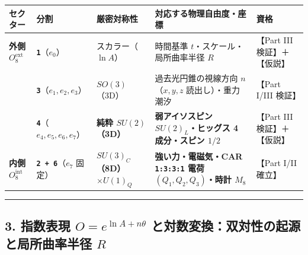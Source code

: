 \documentclass[
  a4paper,
]{ltjsarticle}
\newcounter{none} %
\begin{document}
{\def\LTcaptype{none} %
\begin{longtable}[]{@{}
  >{\raggedright\arraybackslash}p{}
  >{\raggedright\arraybackslash}p{}
  >{\raggedright\arraybackslash}p{}
  >{\raggedright\arraybackslash}p{}
  >{\raggedright\arraybackslash}p{}@{}}
\toprule\noalign{}
\begin{minipage}[b]{\linewidth}\raggedright
セクター
\end{minipage} & \begin{minipage}[b]{\linewidth}\raggedright
分割
\end{minipage} & \begin{minipage}[b]{\linewidth}\raggedright
厳密対称性
\end{minipage} & \begin{minipage}[b]{\linewidth}\raggedright
対応する物理自由度・座標
\end{minipage} & \begin{minipage}[b]{\linewidth}\raggedright
資格
\end{minipage} \\
\midrule\noalign{}
\endhead
\bottomrule\noalign{}
\endlastfoot
\textbf{外側 \(O_8^{\mathrm{ext}}\)} & \textbf{\texttt{1}}（\(e_0\)） &
スカラー（\(\ln A\)） & 時間基準 \(t\)・スケール・局所曲率半径 \(R\) &
【Part III 検証】＋【仮説】 \\
& \textbf{\texttt{3}}（\(e_1,e_2,e_3\)） & \(SO(3)\)（3D） &
過去光円錐の視線方向 \(n\)（\(x,y,z\) 読出し）・重力潮汐 & 【Part I/III
検証】 \\
& \textbf{\texttt{4}}（\(e_4,e_5,e_6,e_7\)） & \textbf{純粋
\(SU(2)\)（3D）} & \textbf{弱アイソスピン \(SU(2)_L\)・ヒッグス 4
成分・スピン \(1/2\)} & 【Part III 検証】＋【仮説】 \\
\textbf{内側 \(O_8^{\mathrm{int}}\)} &
\textbf{\texttt{2\ +\ 6}}（\(e_7\) 固定） &
\textbf{\(SU(3)_C\)（8D）\(\times U(1)_Q\)} &
\textbf{強い力・電磁気・CAR \texttt{1:3:3:1} 電荷
\((Q_1,Q_2,Q_3)\)・時計 \(M_8\)} & 【Part I/II 確立】 \\
\end{longtable}
}

\begin{center}\rule{0.5\linewidth}{0.5pt}\end{center}

\subsection{\texorpdfstring{3. 指数表現 \(O = e^{\ln A + n\theta}\)
と対数変換：双対性の起源と局所曲率半径
\(R\)}{3. 指数表現 O = e\^{}\{\textbackslash ln A + n\textbackslash theta\} と対数変換：双対性の起源と局所曲率半径 R}}\label{ux6307ux6570ux8868ux73fe-o-eln-a-ntheta-ux3068ux5bfeux6570ux5909ux63dbux53ccux5bfeux6027ux306eux8d77ux6e90ux3068ux5c40ux6240ux66f2ux7387ux534aux5f84-r}
\end{document}
